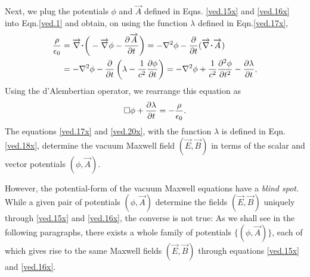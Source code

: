 Next, we plug the potentials $\phi$ and $\vec{A}$ defined in 
Eqns. \eqref{ved.15x} and \eqref{ved.16x} into 
Eqn.\eqref{ved.1} and obtain, on using the function 
$\lambda$ defined in Eqn.\eqref{ved.17x},
\begin{align*}
\frac{\rho}{\epso}
&=\vnab \dotp \bigg( -\vnab \phi- \frac{\dow\vec{A}}{\dow
t}\bigg)=-\nabla^2\phi- \frac{\dow}{\dow t} (\vnab \dotp
\vec{A})
\\&=-\nabla^2\phi-\frac{\dow}{\dow t} \left(\lambda 
-\frac{1}{c^2}\frac{\dow\phi}{\dow t}\right)  
=-\nabla^2\phi+\frac{1}{c^2}\frac{\dow^2\phi}{ \dow t^2} 
-\frac{\dow\lambda}{\dow t},
\end{align*}
Using the d'Alembertian operator, we rearrange this 
equation as
\begin{align}\label{ved.20x}
\Box \phi+\frac{{\partial}\lambda}{{\partial} t}= -\frac{\rho}{\epsilon_0}.
\end{align}
The equations \eqref{ved.17x} and 
\eqref{ved.20x}, with the function $\lambda$ is defined in 
 Eqn.\eqref{ved.18x},  determine the vacuum  Maxwell field 
$(\vec{E},\vec{B})$ in terms of the scalar and vector 
potentials $(\phi,\vec{A})$.

However, the potential-form of the vacuum Maxwell  
equations have a \textsl{blind spot}. While a given pair of  
 potentials $(\phi,\vec{A})$ determine the fields 
$(\vec{E},\vec{B})$ uniquely   through \eqref{ved.15x} and 
\eqref{ved.16x}, the converse is not true: {As we shall see 
in the following paragraphs, there exists a whole family of 
potentials $\{(\phi,\vec{A})\}$, each of which gives rise 
to the same Maxwell fields $(\vec{E},\vec{B})$} through 
equations \eqref{ved.15x} and \eqref{ved.16x}.

